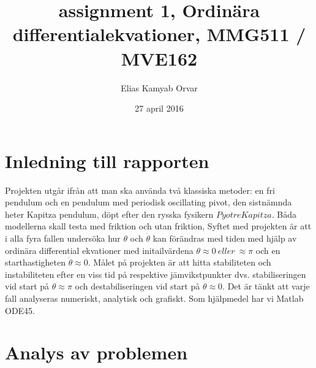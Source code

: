 \documentclass{article}
\title{assignment 1, Ordinära differentialekvationer, MMG511 / MVE162}
\author{Elias Kamyab Orvar}
\date{27 april 2016}  %
\begin{document}
\maketitle


\section{Inledning till rapporten} 
Projekten utgår ifrån att man ska använda två klassiska metoder: en fri pendulum och en pendulum med periodisk oscillating pivot, den sistnämnda heter Kapitza pendulum, döpt efter den rysska fysikern $ Pyotre Kapitza $. Båda modellerna skall testa med friktion och utan friktion, Syftet med projekten är att i alla fyra fallen undersöka hur $ {\theta}$ och $\dot{\theta} $ kan förändras med tiden med hjälp av ordinära differential ekvationer med initailvärdena $ {\theta} \approx 0 \ eller\ \approx {\pi} $ och en starthastigheten $\dot{\theta} \approx 0 $. \newline Målet på projekten är att hitta stabiliteten och instabiliteten efter en viss tid på respektive jämvikstpunkter dvs. stabiliseringen vid start på ${\theta} \approx {\pi}$ och destabiliseringen vid start på ${\theta} \approx 0 $. Det är tänkt att varje fall analyseras numeriskt, analytisk och grafiskt. Som hjälpmedel har vi Matlab ODE45. 
\section{Analys av problemen}
\end{document}
